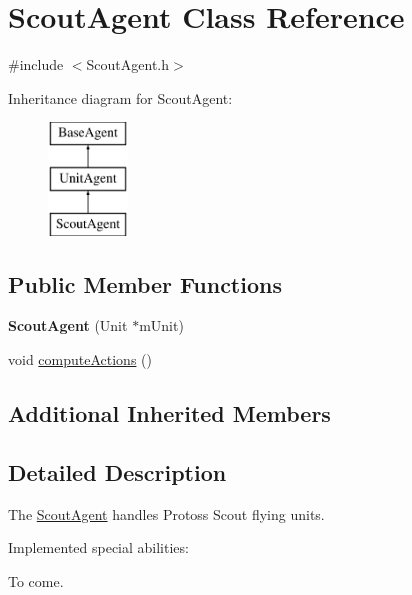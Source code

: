 \hypertarget{class_scout_agent}{\section{Scout\-Agent Class Reference}
\label{class_scout_agent}
}


{\ttfamily \#include $<$Scout\-Agent.\-h$>$}

Inheritance diagram for Scout\-Agent\-:\begin{figure}[H]
\begin{center}
\leavevmode
\includegraphics[height=3.000000cm]{class_scout_agent}
\end{center}
\end{figure}
\subsection*{Public Member Functions}
\begin{DoxyCompactItemize}
\item 
\hypertarget{class_scout_agent_ac57c9b32fd35fc7c52d012ef335aa64a}{{\bfseries Scout\-Agent} (Unit $\ast$m\-Unit)}\label{class_scout_agent_ac57c9b32fd35fc7c52d012ef335aa64a}

\item 
void \hyperlink{class_scout_agent_a99d8dce2c84eba5a20196b3125f6110a}{compute\-Actions} ()
\end{DoxyCompactItemize}
\subsection*{Additional Inherited Members}


\subsection{Detailed Description}
The \hyperlink{class_scout_agent}{Scout\-Agent} handles Protoss Scout flying units.

Implemented special abilities\-:
\begin{DoxyItemize}
\item To come.
\end{DoxyItemize}

